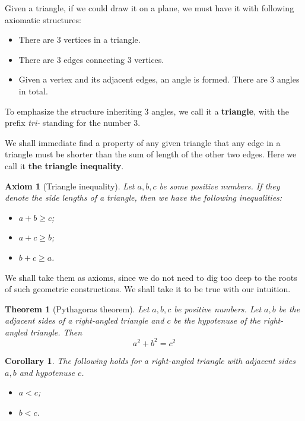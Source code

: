 \documentclass[12pt]{article}
\newtheorem*{theorem}{Theorem}
\newtheorem*{corollary}{Corollary}
\newtheorem*{axiom}{Axiom}
\begin{document}
    Given a triangle, if we could draw it on a plane, we must have it with following axiomatic structures:\begin{itemize}
        \item There are 3 vertices in a triangle.
        \item There are 3 edges connecting 3 vertices.
        \item Given a vertex and its adjacent edges, an angle is formed. There are 3 angles in total.
    \end{itemize}

    To emphasize the structure inheriting 3 angles, we call it a \textbf{triangle}, with the prefix \textit{tri-} standing for the number 3.

    We shall immediate find a property of any given triangle that any edge in a triangle must be shorter than the sum of length of the other two edges. Here we call it \textbf{the triangle inequality}.

    \begin{axiom}[Triangle inequality]
        Let $a,b,c$ be some positive numbers. If they denote the side lengths of a triangle, then we have the following inequalities:\begin{itemize}
            \item $a+b\geq c$;
            \item $a+c\geq b$;
            \item $b+c\geq a$.
        \end{itemize}
    \end{axiom}

    We shall take them as axioms, since we do not need to dig too deep to the roots of such geometric constructions. We shall take it to be true with our intuition.

    \begin{theorem}[Pythagoras theorem]
        Let $a,b,c$ be positive numbers. Let $a,b$ be the adjacent sides of a right-angled triangle and $c$ be the hypotenuse of the right-angled triangle. Then $$a^2+b^2=c^2$$
    \end{theorem}

    \begin{corollary}
        The following holds for a right-angled triangle with adjacent sides $a,b$ and hypotenuse $c$.
        \begin{itemize}
            \item $a<c$;
            \item $b<c$.
        \end{itemize}
    \end{corollary}
\end{document}
